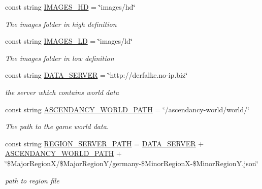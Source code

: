 \begin{DoxyCompactItemize}
const string \hyperlink{classClient_1_1Common_1_1Constants_1_1ClientConstants_a623fb594e6206e25070a6b6bb1f00da2}{I\+M\+A\+G\+E\+S\+\_\+\+H\+D} = \char`\"{}images/hd\char`\"{}
\begin{DoxyCompactList}\small\item\em The images folder in high definition \end{DoxyCompactList}\item 
const string \hyperlink{classClient_1_1Common_1_1Constants_1_1ClientConstants_a83f0b2a7d1545a5f1229fe388b850070}{I\+M\+A\+G\+E\+S\+\_\+\+L\+D} = \char`\"{}images/ld\char`\"{}
\begin{DoxyCompactList}\small\item\em The images folder in low definition \end{DoxyCompactList}\item 
const string \hyperlink{classClient_1_1Common_1_1Constants_1_1ClientConstants_a906b8b02ae4c5068a0e8200f61874cec}{D\+A\+T\+A\+\_\+\+S\+E\+R\+V\+E\+R} = \char`\"{}http\+://derfalke.\+no-\/ip.\+biz\char`\"{}
\begin{DoxyCompactList}\small\item\em the server which contains world data \end{DoxyCompactList}\item 
const string \hyperlink{classClient_1_1Common_1_1Constants_1_1ClientConstants_acb34be367701b302fac7ffcf5b5e3bf0}{A\+S\+C\+E\+N\+D\+A\+N\+C\+Y\+\_\+\+W\+O\+R\+L\+D\+\_\+\+P\+A\+T\+H} = \char`\"{}/ascendancy-\/world/world/\char`\"{}
\begin{DoxyCompactList}\small\item\em The path to the game world data. \end{DoxyCompactList}\item 
const string \hyperlink{classClient_1_1Common_1_1Constants_1_1ClientConstants_a7fa21e9a22967348de75863f83d8324e}{R\+E\+G\+I\+O\+N\+\_\+\+S\+E\+R\+V\+E\+R\+\_\+\+P\+A\+T\+H} = \hyperlink{classClient_1_1Common_1_1Constants_1_1ClientConstants_a906b8b02ae4c5068a0e8200f61874cec}{D\+A\+T\+A\+\_\+\+S\+E\+R\+V\+E\+R} + \hyperlink{classClient_1_1Common_1_1Constants_1_1ClientConstants_acb34be367701b302fac7ffcf5b5e3bf0}{A\+S\+C\+E\+N\+D\+A\+N\+C\+Y\+\_\+\+W\+O\+R\+L\+D\+\_\+\+P\+A\+T\+H} + \char`\"{}\$Major\+Region\+X/\$Major\+Region\+Y/germany-\/\$Minor\+Region\+X-\/\$Minor\+Region\+Y.\+json\char`\"{}
\begin{DoxyCompactList}\small\item\em path to region file \end{DoxyCompactList}\item 

\end{DoxyCompactItemize}

